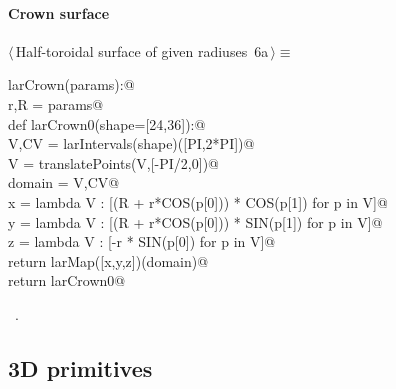 \documentclass[11pt,oneside]{article}	%
\begin{document}
\paragraph{Crown surface}
\begin{flushleft} \small \label{scrap11}
\protect{}$\langle\,$Half-toroidal surface of given radiuses\nobreak\ {\footnotesize 6a}$\,\rangle\equiv$
\vspace{-1ex}
\begin{list}{}{} \item
\mbox{}\verb@def larCrown(params):@\\
\mbox{}\verb@   r,R = params@\\
\mbox{}\verb@   def larCrown0(shape=[24,36]):@\\
\mbox{}\verb@      V,CV = larIntervals(shape)([PI,2*PI])@\\
\mbox{}\verb@      V = translatePoints(V,[-PI/2,0])@\\
\mbox{}\verb@      domain = V,CV@\\
\mbox{}\verb@      x = lambda V : [(R + r*COS(p[0])) * COS(p[1]) for p in V]@\\
\mbox{}\verb@      y = lambda V : [(R + r*COS(p[0])) * SIN(p[1]) for p in V]@\\
\mbox{}\verb@      z = lambda V : [-r * SIN(p[0]) for p in V]@\\
\mbox{}\verb@      return larMap([x,y,z])(domain)@\\
\mbox{}\verb@   return larCrown0@\\
\mbox{}\verb@@{\NWsep}
\end{list}
\vspace{-1ex}
\footnotesize\addtolength{\baselineskip}{-1ex}
\begin{list}{}{\setlength{\itemsep}{-\parsep}\setlength{\itemindent}{-\leftmargin}}
\item \NWtxtMacroRefIn\ .
\end{list}
\end{flushleft}

\subsection{3D primitives}
\end{document}
